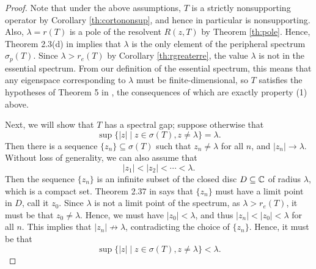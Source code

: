 \begin{proof}
	Note that under the above assumptions, $T$ is a strictly nonsupporting operator by Corollary \ref{th:cortononsup}, and hence in particular is nonsupporting. Also, $\lambda = r(T)$ is a pole of the resolvent $R(z, T)$ by Theorem \ref{th:pole}. Hence, Theorem 2.3(d) in \cite{Marek1970} implies that $\lambda$ is the only element of the peripheral spectrum $\sigma_p(T)$. Since $\lambda > r_e(T)$ by Corollary \ref{th:rgreaterre}, the value $\lambda$ is not in the essential spectrum. From our definition of the essential spectrum, this means that any eigenspace corresponding to $\lambda$ must be finite-dimensional, so $T$ satisfies the hypotheses of Theorem 5 in \cite{Sawashima1964}, the consequences of which are exactly property (1) above.
	
	Next, we will show that $T$ has a spectral gap; suppose otherwise that
	\[\sup\{ |z| \mid z \in \sigma(T), z \neq \lambda\} = \lambda.\]
	Then there is a sequence $\{z_n\} \subseteq \sigma(T)$ such that $z_n \neq \lambda$ for all $n$, and $|z_n| \to \lambda$. Without loss of generality, we can also assume that
	\[|z_1| < |z_2| < \cdots < \lambda.\]
	Then the sequence $\{z_n\}$ is an infinite subset of the closed disc $D \subseteq \mathbb{C}$ of radius $\lambda$, which is a compact set. Theorem 2.37 in \cite{Rudin1976} says that $\{z_n\}$ must have a limit point in $D$, call it $z_0$. Since $\lambda$ is not a limit point of the spectrum, as $\lambda > r_e(T)$, it must be that $z_0 \neq \lambda$. Hence, we must have $|z_0| < \lambda$, and thus $|z_n| < |z_0| < \lambda$ for all $n$. This implies that $|z_n| \not \to \lambda$, contradicting the choice of $\{z_n\}$. Hence, it must be that
	\[\sup\{ |z| \mid z \in \sigma(T), z \neq \lambda\} < \lambda.\]
	

\end{proof}
